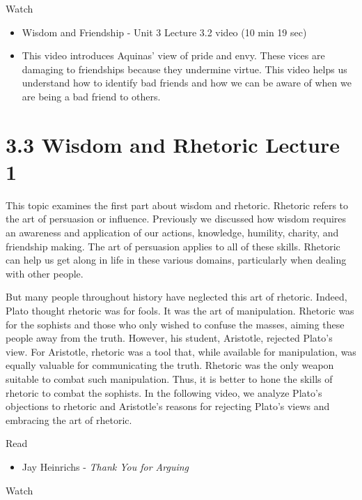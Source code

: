 \documentclass[
]{book}
\providecommand{\tightlist}{%
  \setlength{\itemsep}{0pt}\setlength{\parskip}{0pt}}
\begin{document}
Watch

\begin{itemize}
\tightlist
\item
  Wisdom and Friendship - Unit 3 Lecture 3.2 video (10 min 19 sec)
\item
  This video introduces Aquinas' view of pride and envy. These vices are damaging to friendships because they undermine virtue. This video helps us understand how to identify bad friends and how we can be aware of when we are being a bad friend to others.
\end{itemize}

\hypertarget{wisdom-and-rhetoric-lecture-1}{%
\section*{3.3 Wisdom and Rhetoric Lecture 1}\label{wisdom-and-rhetoric-lecture-1}}

This topic examines the first part about wisdom and rhetoric. Rhetoric refers to the art of persuasion or influence. Previously we discussed how wisdom requires an awareness and application of our actions, knowledge, humility, charity, and friendship making. The art of persuasion applies to all of these skills. Rhetoric can help us get along in life in these various domains, particularly when dealing with other people.

But many people throughout history have neglected this art of rhetoric. Indeed, Plato thought rhetoric was for fools. It was the art of manipulation. Rhetoric was for the sophists and those who only wished to confuse the masses, aiming these people away from the truth. However, his student, Aristotle, rejected Plato's view. For Aristotle, rhetoric was a tool that, while available for manipulation, was equally valuable for communicating the truth. Rhetoric was the only weapon suitable to combat such manipulation. Thus, it is better to hone the skills of rhetoric to combat the sophists. In the following video, we analyze Plato's objections to rhetoric and Aristotle's reasons for rejecting Plato's views and embracing the art of rhetoric.

Read

\begin{itemize}
\tightlist
\item
  Jay Heinrichs - \emph{Thank You for Arguing}
\end{itemize}

Watch
\end{document}
